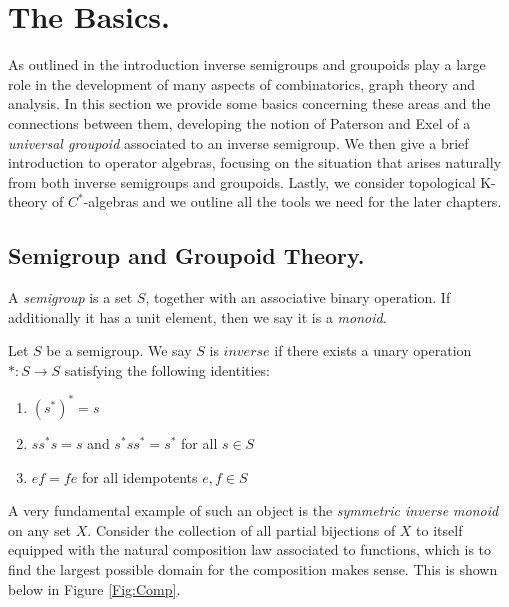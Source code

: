 \chapter{The Basics.}
As outlined in the introduction inverse semigroups and groupoids play a large role in the development of many aspects of combinatorics, graph theory and analysis. In this section we provide some basics concerning these areas and the connections between them, developing the notion of Paterson and Exel of a \textit{universal groupoid} associated to an inverse semigroup. We then give a brief introduction to operator algebras, focusing on the situation that arises naturally from both inverse semigroups and groupoids. Lastly, we consider topological K-theory of $C^{*}$-algebras and we outline all the tools we need for the later chapters.

\section{Semigroup and Groupoid Theory.}

A \textit{semigroup} is a set $S$, together with an associative binary operation. If additionally it has a unit element, then we say it is a \textit{monoid}.

\begin{definition}\label{Def:invsemi}
Let $S$ be a semigroup. We say $S$ is $inverse$ if there exists a unary operation $*:S \rightarrow S$ satisfying the following identities:
\begin{enumerate}
\item $(s^{*})^{*}=s$
\item $ss^{*}s=s$ and $s^{*}ss^{*}=s^{*}$ for all $s \in S$
\item $ef=fe$ for all idempotents $e,f \in S$ 
\end{enumerate}
\end{definition}

A very fundamental example of such an object is the \textit{symmetric inverse monoid} on any set $X$. Consider the collection of all partial bijections of $X$ to itself equipped with the  natural composition law associated to functions, which is to find the largest possible domain for the composition makes sense. This is shown below in Figure \ref{Fig:Comp}.


